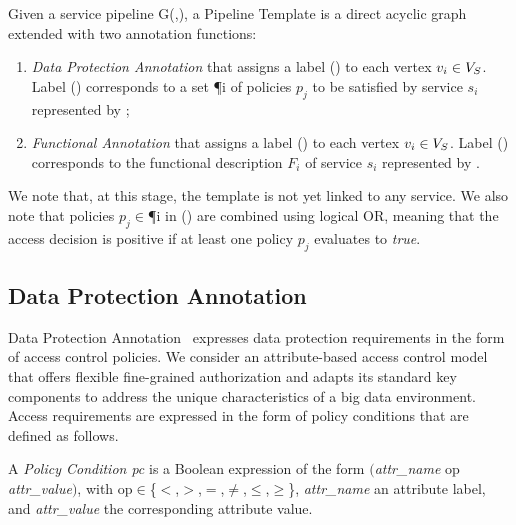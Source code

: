 \begin{definition} \label{def:template}
  Given a service pipeline G(\V,\E), a Pipeline Template \tChartFunction is a direct acyclic graph extended with two annotation functions:
  \begin{enumerate}%
    \item \emph{Data Protection Annotation} \myLambda that assigns a label \myLambda() to each vertex $v_{i}\in V_S$. Label \myLambda() corresponds to a set \P{i} of policies $p_j$ to be satisfied by service $s_i$ represented by ;
    \item \emph{Functional Annotation} \myGamma that assigns a label \myGamma() to each vertex $v_{i}\in V_S$. Label \myGamma() corresponds to the functional description $F_i$ of service $s_i$ represented by .
  \end{enumerate}
\end{definition}

\vspace{0.5em}

We note that, at this stage, the template is not yet linked to any service.
We also note that policies $p_j$$\in$\P{i} in \myLambda() are combined using logical OR, meaning that the access decision is positive if at least one policy $p_j$ evaluates to \emph{true}.

      \subsection{Data Protection Annotation}\label{sec:nonfuncannotation}
      Data Protection Annotation \myLambda\ expresses data protection requirements in the form of access control policies. We consider an attribute-based access control model that offers flexible fine-grained authorization and adapts its standard key components to address the unique characteristics of a big data environment. Access requirements are expressed in the form of policy conditions that are defined as follows.

      \vspace{0.5em}

      \begin{definition}\label{def:policy_cond}
        A \emph{Policy Condition pc} is a Boolean expression of the form $($\emph{attr\_name} op \emph{attr\_value}$)$, with op$\in$\{$<$,$>$,$=$,$\neq$,$\leq$,$\geq$\}, \emph{attr\_name} an attribute label, and \emph{attr\_value} the corresponding attribute value.
      \end{definition}

